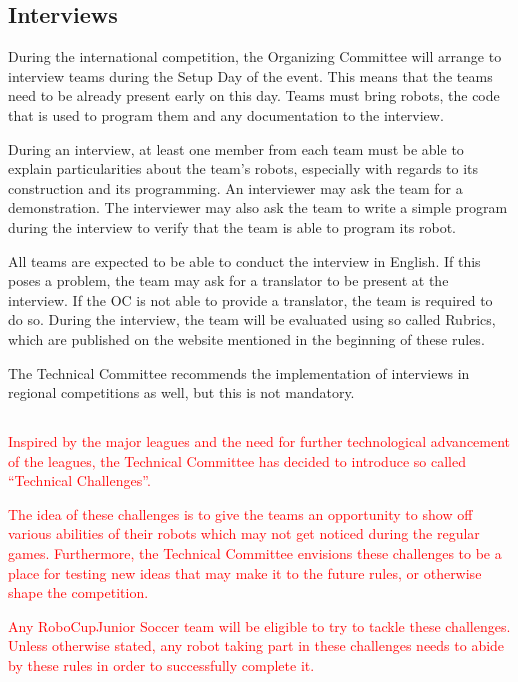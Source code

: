 \documentclass{article}
\begin{document}
\subsection{Interviews \label{ref-060}}

During the international competition, the Organizing Committee will arrange to
interview teams during the Setup Day of the event. This means that the teams
need to be already present early on this day. Teams must bring robots, the code
that is used to program them and any documentation to the interview.

During an interview, at least one member from each team must be able to explain
particularities about the team's robots, especially with regards to its
construction and its programming. An interviewer may ask the team for a
demonstration. The interviewer may also ask the team to write a simple program
during the interview to verify that the team is able to program its robot.

All teams are expected to be able to conduct the interview in English. If this
poses a problem, the team may ask for a translator to be present at the
interview. If the OC is not able to provide a translator, the team is required
to do so. During the interview, the team will be evaluated using so called
Rubrics, which are published on the website mentioned in the beginning of these
rules.

The Technical Committee recommends the implementation of interviews in regional
competitions as well, but this is not mandatory.

\subsection{}

\textcolor{red}{Inspired by the major leagues and the need for further technological
advancement of the leagues, the Technical Committee has decided to introduce so
called ``Technical Challenges''.}

\textcolor{red}{The idea of these challenges is to give the teams an opportunity to show off
various abilities of their robots which may not get noticed during the regular
games. Furthermore, the Technical Committee envisions these challenges to be a
place for testing new ideas that may make it to the future rules, or otherwise
shape the competition.}

\textcolor{red}{Any RoboCupJunior Soccer team will be eligible to try to tackle these
challenges. Unless otherwise stated, any robot taking part in these
challenges needs to abide by these rules in order to successfully complete it.}
\end{document}

